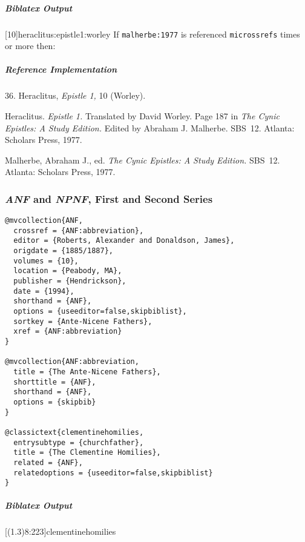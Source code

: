 \documentclass[a4paper]{article}
\newenvironment{biboutput}{%
  \subparagraph{Biblatex Output}
}{\color{black}}
\newenvironment{refimp}{%
  \subparagraph{Reference Implementation}
  \color{reference-colour}
  \rm
}{\par\color{black}}
\begin{document}
\begin{biboutput}
  [10]{heraclitus:epistle1:worley}
  If \texttt{malherbe:1977} is referenced \texttt{microssrefs} times or more
  then:\par
\end{biboutput}

\begin{refimp}
  \hspace*{\bibindent}36. Heraclitus, \emph{Epistle 1,} 10 (Worley).

  \hangindent\bibindent Heraclitus. \emph{Epistle 1.} Translated by David
  Worley. Page 187 in \emph{The Cynic Epistles: A Study Edition.} Edited by
  Abraham J. Malherbe. SBS~12. Atlanta: Scholars Press, 1977.

  \hangindent\bibindent Malherbe, Abraham J., ed. \emph{The Cynic Epistles: A
  Study Edition.} SBS~12. Atlanta: Scholars Press, 1977.

\end{refimp}

\subsubsection{\emph{ANF} and \emph{NPNF}, First and Second Series}

\begin{lstlisting}
@mvcollection{ANF,
  crossref = {ANF:abbreviation},
  editor = {Roberts, Alexander and Donaldson, James},
  origdate = {1885/1887},
  volumes = {10},
  location = {Peabody, MA},
  publisher = {Hendrickson},
  date = {1994},
  shorthand = {ANF},
  options = {useeditor=false,skipbiblist},
  sortkey = {Ante-Nicene Fathers},
  xref = {ANF:abbreviation}
}

@mvcollection{ANF:abbreviation,
  title = {The Ante-Nicene Fathers},
  shorttitle = {ANF},
  shorthand = {ANF},
  options = {skipbib}
}

@classictext{clementinehomilies,
  entrysubtype = {churchfather},
  title = {The Clementine Homilies},
  related = {ANF},
  relatedoptions = {useeditor=false,skipbiblist}
}
\end{lstlisting}

\begin{biboutput}
  [(1.3)8:223]{clementinehomilies}
\end{biboutput}
\end{document}
